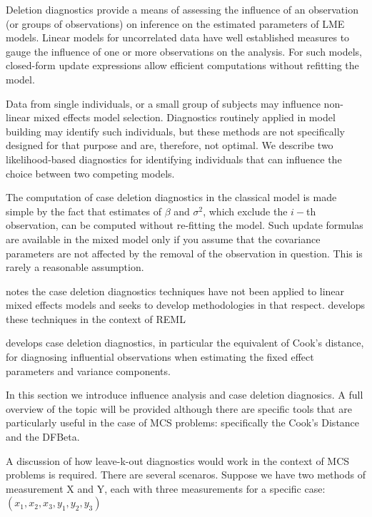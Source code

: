 \documentclass[12pt, a4paper]{report}
\theoremstyle{plain}
\theoremstyle{definition}
\theoremstyle{remark}
\begin{document}
Deletion diagnostics provide a means of assessing the influence of an observation (or groups of observations) on inference on the estimated parameters of LME models. Linear models for uncorrelated data have well established measures to gauge the influence of one or more observations on the analysis. For such models, closed-form update expressions allow efficient computations without refitting the model.

Data from single individuals, or a small group of subjects may influence non-linear mixed effects model selection. Diagnostics routinely applied in model building may identify such individuals, but these methods are not specifically designed for that purpose and are, therefore, not optimal. We describe two likelihood-based diagnostics for identifying individuals that can influence the choice between two competing models.


The computation of case deletion diagnostics in the classical model is made simple by the fact that estimates of $\beta$ and $\sigma^2$, which exclude the $i-$th observation, can be computed without re-fitting the model. Such update formulas are available in the mixed model only if you assume that the covariance parameters are not affected by the removal of the observation in question. This is rarely a reasonable assumption.

\citet{Christiansen} notes the case deletion diagnostics techniques have not been applied to linear mixed effects models and seeks to develop methodologies in that respect. \citet{Christiansen} develops these techniques in the context of REML

\citet{Christiansen} develops  case deletion diagnostics, in particular the equivalent of  Cook's distance, for diagnosing influential observations when estimating the fixed effect parameters and variance components.

In this section we introduce influence analysis and case deletion diagnosics. A full overview of the topic will be provided although there are specific tools that are particularly useful in the case of MCS problems: specifically the Cook's Distance and the DFBeta.

A discussion of how leave-k-out diagnostics would work in the context of MCS problems is required. There are several scenaros. Suppose we have two methods of measurement X and Y, each with three measurements for a specific case: $(x_1,x_2,x_3,y_1,y_2,y_3)$
\end{document}
